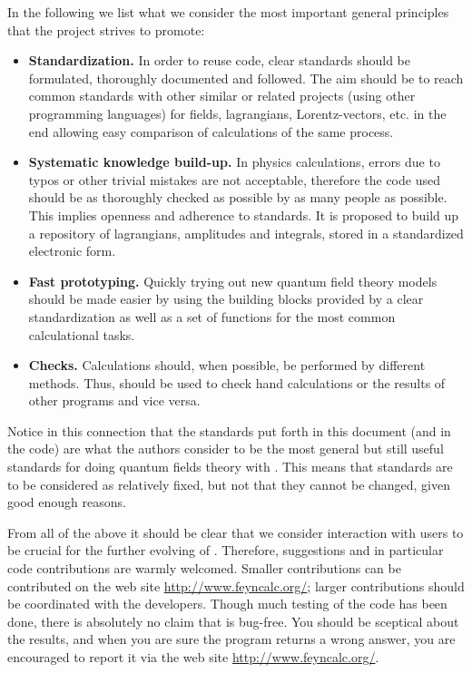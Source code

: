 In the following we list what we consider the most important general principles that the \fc
project strives to promote:

\begin{itemize}

\item{{\bf Standardization.} In order to reuse code, clear standards should be formulated,
thoroughly documented and followed. The aim should be to reach common standards with
other similar or related projects (using other programming languages) for fields, lagrangians,
Lorentz-vectors, etc. in the end allowing easy comparison of calculations of the same process.}

\item{{\bf Systematic knowledge build-up.} In physics calculations, errors due to typos or
other trivial mistakes are not acceptable, therefore the code used should be as thoroughly
checked as possible by as many people as possible. This implies openness and adherence to
standards. It is proposed to build up a repository of lagrangians, amplitudes and integrals,
stored in a standardized electronic form.}


\item{{\bf Fast prototyping.} Quickly trying out new quantum field theory models should be made
easier by using the building blocks provided by a clear standardization as well as a set of
functions for the most common calculational tasks.}

\item{{\bf Checks.} Calculations should, when possible, be performed by different methods.
Thus, \fc should be used to check hand calculations or the results of other programs and
vice versa.}

\end{itemize}

Notice in this connection that the standards put forth in this document (and in the code) are what
the authors consider to be the most general but still useful standards for doing quantum fields
theory with \mma. This means that standards are to be considered as relatively fixed, but not that
they cannot be changed, given good enough reasons.

From all of the above it should be clear that we consider interaction with users to be crucial
for the further evolving of \fc. Therefore, suggestions and in particular
code contributions are warmly welcomed. Smaller contributions can be contributed
on the web site \href{http://www.feyncalc.org/}{http://www.feyncalc.org/}; 
larger contributions should be coordinated with the developers.
Though much testing of the code has been done, there is absolutely no claim that
\fc is bug-free. You should be sceptical about the results, and when you are sure the
program  returns a wrong answer, you are encouraged to report it via the web site
\href{http://www.feyncalc.org/}{http://www.feyncalc.org/}.

